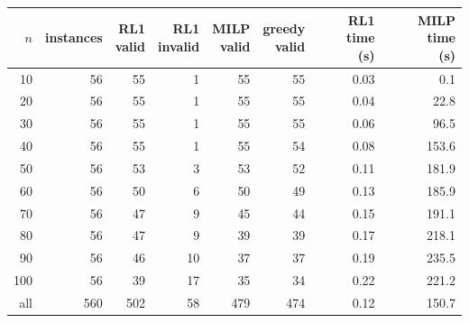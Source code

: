 \begin{tabular}{@{}rrrrrrrr@{}}
\toprule
$n$ & instances & \shortstack[r]{RL1\\valid} & \shortstack[r]{RL1\\invalid} & \shortstack[r]{MILP\\valid} & \shortstack[r]{greedy\\valid} & \shortstack[r]{RL1 time\\(s)} & \shortstack[r]{MILP time\\(s)} \\
\midrule
10 & 56 & 55 & 1 & 55 & 55 & 0.03 & 0.1 \\
20 & 56 & 55 & 1 & 55 & 55 & 0.04 & 22.8 \\
30 & 56 & 55 & 1 & 55 & 55 & 0.06 & 96.5 \\
40 & 56 & 55 & 1 & 55 & 54 & 0.08 & 153.6 \\
50 & 56 & 53 & 3 & 53 & 52 & 0.11 & 181.9 \\
60 & 56 & 50 & 6 & 50 & 49 & 0.13 & 185.9 \\
70 & 56 & 47 & 9 & 45 & 44 & 0.15 & 191.1 \\
80 & 56 & 47 & 9 & 39 & 39 & 0.17 & 218.1 \\
90 & 56 & 46 & 10 & 37 & 37 & 0.19 & 235.5 \\
100 & 56 & 39 & 17 & 35 & 34 & 0.22 & 221.2 \\
\midrule
all & 560 & 502 & 58 & 479 & 474 & 0.12 & 150.7 \\
\bottomrule
\end{tabular}
